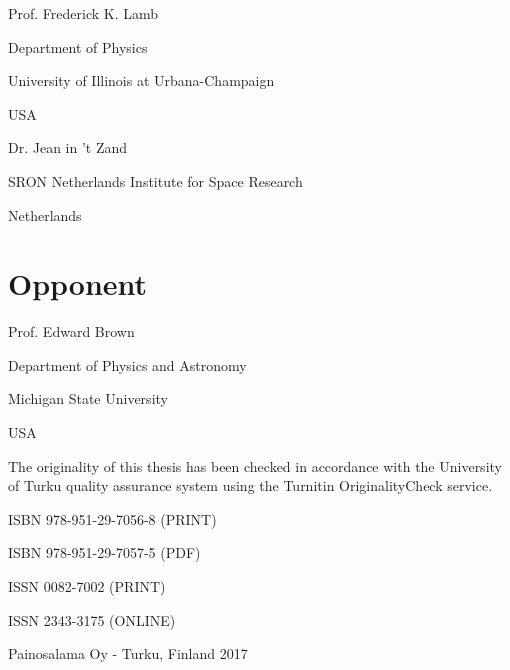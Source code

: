 Prof. Frederick K. Lamb

Department of Physics 

University of Illinois at Urbana-Champaign

USA

\vspace{0.5cm}
Dr. Jean in 't Zand

SRON Netherlands Institute for Space Research 

Netherlands




\section*{Opponent}

Prof. Edward Brown

Department of Physics and Astronomy

Michigan State University

USA

\vspace{0.5cm}

The originality of this thesis has been checked in accordance with the University of Turku quality assurance system using the Turnitin OriginalityCheck service.

\vspace{0.5cm}

ISBN 978-951-29-7056-8 (PRINT) 

ISBN 978-951-29-7057-5 (PDF)

ISSN 0082-7002 (PRINT)

ISSN 2343-3175 (ONLINE) 

Painosalama Oy - Turku, Finland 2017


\setlength{\parindent}{1.5em}
